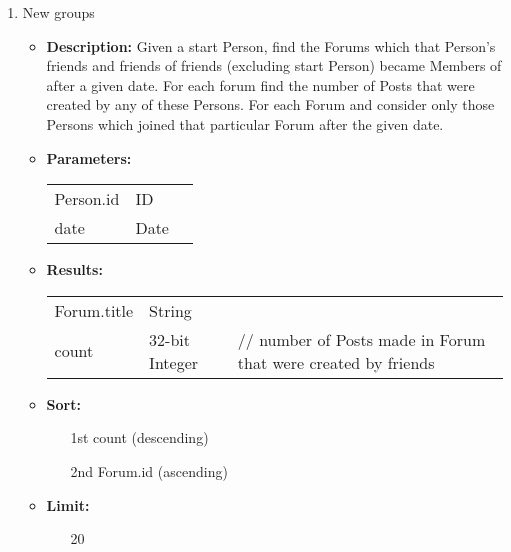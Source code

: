 {\begin{enumerate}
        \item New groups
            \begin{itemize}
                \item \textbf{Description:}
                    Given a start Person, find the Forums which that Person's friends
                    and friends of friends (excluding start Person) became Members of
                    after a given date.  For each forum find the number of Posts
                    that were created by any of these Persons. 
                    For each Forum and consider only
                    those Persons which joined that particular
                    Forum after the given date.  
                \item \textbf{Parameters:} \\
                    \begin{tabular}{lll}
                        Person.id 										& ID & \\
                        date 											& Date & \\
                    \end{tabular}		
                \item \textbf{Results:} \\
                    \begin{tabular}{lll}
                        Forum.title 										& String & \\
                        count 	 											& 32-bit Integer & \parbox[t]{20cm}{// number of Posts made in Forum that were created 																							by friends \par \strut} \\
                    \end{tabular}		
                \item \textbf{Sort:}
                  \begin{itemize}
                    \item[1st] count (descending)
                    \item[2nd] Forum.id (ascending)
                  \end{itemize}
                \item \textbf{Limit:}
                  \begin{itemize}
                    \item[] 20 
                  \end{itemize}
            \end{itemize}


\end{enumerate}}
